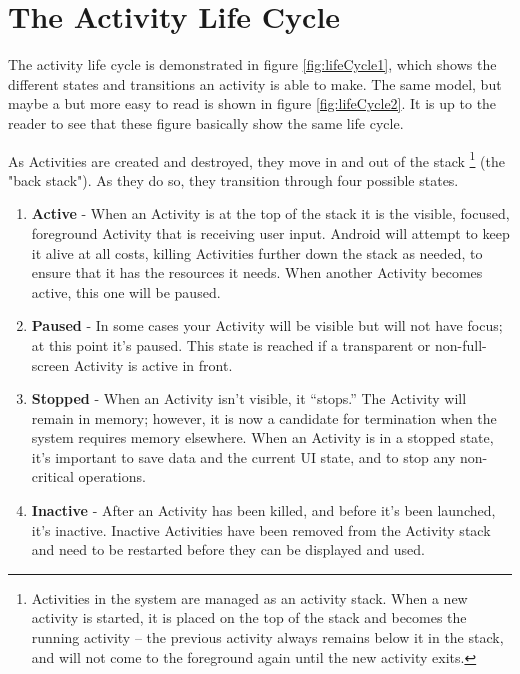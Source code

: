\section{The Activity Life Cycle}
The activity life cycle is demonstrated in figure \ref{fig:lifeCycle1}, which shows the different states and transitions an activity is able to make. The same model, but maybe a but more easy to read is shown in figure \ref{fig:lifeCycle2}. It is up to the reader to see that these figure basically show the same life cycle. 

As Activities are created and destroyed, they move in and out of the stack \footnote{Activities in the system are managed as an activity stack. When a new activity is started, it is placed on the top of the stack and becomes the running activity -- the previous activity always remains below it in the stack, and will not come to the foreground again until the new activity exits.} (the "back stack"). As they do so, they transition through four possible states.

\begin{enumerate}
	\item \textbf{Active} - When an Activity is at the top of the stack it is the visible, focused, foreground Activity that is receiving user input. Android will attempt to keep it alive at all costs, killing Activities further down the stack as needed, to ensure that it has the resources it needs. When another Activity becomes active, this one will be paused.
	\item \textbf{Paused} - In some cases your Activity will be visible but will not have focus; at this point it’s paused. This state is reached if a transparent or non-full-screen Activity is active in front.
	\item \textbf{Stopped} - When an Activity isn’t visible, it “stops.” The Activity will remain in memory; however, it is now a candidate for termination when the system requires memory elsewhere. When an Activity is in a stopped state, it’s important to save data and the current UI state, and to stop any non-critical operations.
	\item \textbf{Inactive} - After an Activity has been killed, and before it’s been launched, it’s inactive. Inactive Activities have been removed from the Activity stack and need to be restarted before they can be displayed and used.
\end{enumerate}

